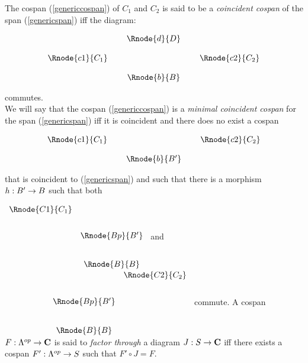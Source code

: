 \documentclass[10pt,a4paper]{scrartcl}
\begin{document}
\noindent
The cospan (\ref{genericcospan}) of $C_1$ and $C_2$ is said to be a 
\textit{coincident cospan} of the span (\ref{genericspan}) iff the 
diagram:
\begin{center}
\begin{equation}
\begin{array}{cp{0.1cm}cp{0.1cm} c}
            & &\Rnode{d}{D}                           \\ [0.4cm]
\Rnode{c1}{C_1}& &                & & \Rnode{c2}{C_2} \\ [0.4cm]
            & &\Rnode{b}{B}
\end{array}
\end{equation}
\end{center}

\noindent commutes. \\

\noindent We will say that the cospan (\ref{genericcospan}) is a 
\textit{minimal coincident cospan} for the span (\ref{genericspan}) iff it is 
coincident  and there does no exist a cospan 
\begin{center}
\begin{equation}
\begin{array}{cp{0.1cm}cp{0.1cm} c}
\Rnode{c1}{C_1}& &                & & \Rnode{c2}{C_2} \\ [0.4cm]
            & &\Rnode{b}{B'}
\end{array}
\end{equation}
\end{center}

\noindent
that is coincident to (\ref{genericspan}) and such that there is a morphism 
$h: B' \rightarrow B$ such that both \\
\vspace {0.25cm}

$
\begin{array}{cc}
\Rnode{C1}{C_1}                             \\ [0.7cm]
               & \Rnode{Bp}{B'}             \\ [0.8cm]
							 &  \Rnode{B}{B} 
\end{array}
$
and
$
\begin{array}{p{1.5cm}cc}
&                &\Rnode{C2}{C_2}     \\ [0.7cm]
&\Rnode{Bp}{B'}                       \\ [0.8cm]
&\Rnode{B}{B}
\end{array}
$
commute. 
\noindent
A cospan $F:\Lambda^{op} \rightarrow \textbf{C}$ is said to \textit{factor through}  a diagram 
$J:S \rightarrow \textbf{C}$ iff there exists a cospan $F': \Lambda^{op} \rightarrow S$ 
such that $F' \circ J = F$.
  
\end{document}
